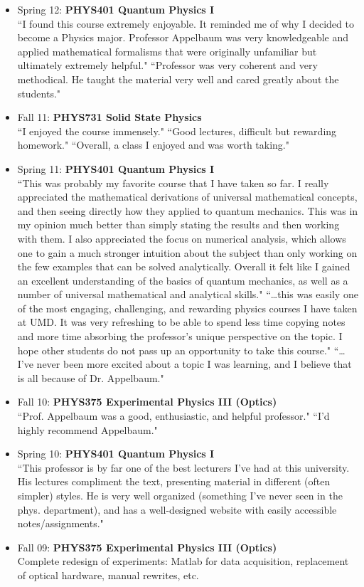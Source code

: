 \documentclass[paper=letter,fontsize=11pt]{scrartcl} %
\newcommand{\CourseEntry}[3]{
		\noindent \item{#1: \textbf{#2} \\ #3}}
\begin{document}
\begin{itemize}
\CourseEntry{Spring 12}{PHYS401 Quantum Physics I}
{``I found this course extremely enjoyable. It reminded me of why I decided to become a Physics major. Professor Appelbaum was very knowledgeable and applied mathematical formalisms that were originally unfamiliar but ultimately extremely helpful."  ``Professor was very coherent and very methodical. He taught the material very well and cared greatly about the students."} 

\CourseEntry{Fall 11}{PHYS731 Solid State Physics}
{``I enjoyed the course immensely." ``Good lectures, difficult but rewarding homework." ``Overall, a class I enjoyed and was worth taking." %
}

\CourseEntry{Spring 11}{PHYS401 Quantum Physics I}
{``This was probably my favorite course that I have taken so far. I really appreciated the mathematical derivations of universal mathematical concepts, and then seeing directly how they applied to quantum mechanics. This was in my opinion much better than simply stating the results and then working with them. I also appreciated the focus on numerical analysis, which allows one to gain a much stronger intuition about the subject than only working on the few examples that can be solved analytically. Overall it felt like I gained an excellent understanding of the basics of quantum mechanics, as well as a number of universal mathematical and analytical skills." ``\ldots this was easily one of the most engaging, challenging, and rewarding physics courses I have taken at UMD. It was very refreshing to be able to spend less time copying notes and more time absorbing the professor's unique perspective on the topic. I hope other students do not pass up an opportunity to take this course." ``\ldots I've never been more excited about a topic I was learning, and I believe that is all because of Dr. Appelbaum."}

\CourseEntry{Fall 10}{PHYS375 Experimental Physics III (Optics)}
{``Prof. Appelbaum was a good, enthusiastic, and helpful professor." ``I'd highly recommend Appelbaum."}

\CourseEntry{Spring 10}{PHYS401 Quantum Physics I}
{``This professor is by far one of the best lecturers I've had at this university. His lectures compliment the text, presenting material in different (often simpler) styles. He is very well organized (something I’ve never seen in the phys. department), and has a well-designed website with easily accessible notes/assignments."}

\CourseEntry{Fall 09}{PHYS375 Experimental Physics III (Optics)}
{Complete redesign of experiments: Matlab for data acquisition, replacement of optical hardware, manual rewrites, etc.}
\end{itemize}
\end{document}
